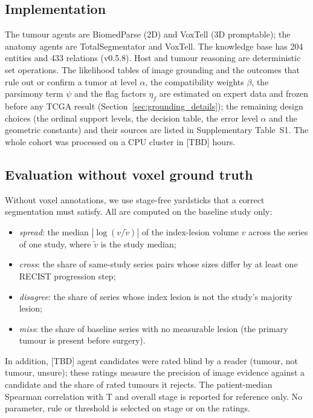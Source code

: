 \documentclass[fleqn,10pt]{olplainarticle}
\begin{document}
\subsection{Implementation}
The tumour agents are BiomedParse (2D) and VoxTell (3D promptable); the anatomy agents are TotalSegmentator and VoxTell. The
knowledge base has 204 entities and 433 relations (v0.5.8). Host and tumour reasoning are deterministic set operations.
The likelihood tables of image grounding and the outcomes that rule out or confirm a tumor at level $\alpha$, the
compatibility weights $\beta$, the parsimony term $\psi$ and the flag factors $\eta_f$ are estimated on expert data and frozen
before any TCGA result (Section~\ref{sec:grounding_details}); the remaining design choices (the ordinal support levels, the
decision table, the error level $\alpha$ and the geometric constants) and their sources are listed in Supplementary
Table~S1. The whole cohort was processed on a CPU cluster in [TBD] hours.

\subsection{Evaluation without voxel ground truth}
\label{sec:eval_protocol}
Without voxel annotations, we use stage-free yardsticks that a correct segmentation must satisfy. All are computed on
the baseline study only:
\begin{itemize}
  \item \emph{spread}: the median $|\log(v/\tilde v)|$ of the index-lesion volume $v$ across the series of one study,
  where $\tilde v$ is the study median;
  \item \emph{cross}: the share of same-study series pairs whose sizes differ by at least one RECIST progression step;
  \item \emph{disagree}: the share of series whose index lesion is not the study's majority lesion;
  \item \emph{miss}: the share of baseline series with no measurable lesion (the primary tumour is present before
  surgery).
\end{itemize}
In addition, [TBD] agent candidates were rated blind by a reader (tumour, not tumour, unsure); these ratings measure the
precision of image evidence against a candidate and the share of rated tumours it rejects. The patient-median Spearman
correlation with T and overall stage is reported for reference only. No parameter, rule or threshold is selected on stage
or on the ratings.
\end{document}
